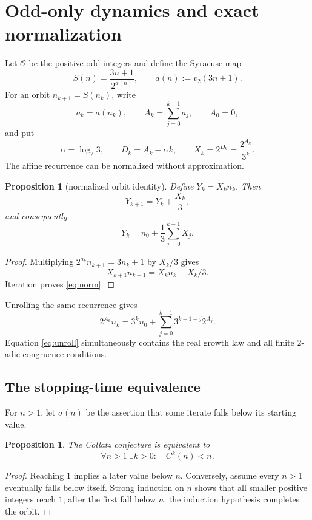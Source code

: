 \documentclass[11pt,reqno]{amsart}
\theoremstyle{plain}
\newtheorem{proposition}[theorem]{Proposition}
\theoremstyle{definition}
\numberwithin{equation}{section}
\newcommand{\Odd}{\mathcal{O}}
\begin{document}
\section{Odd-only dynamics and exact normalization}
\label{sec:odd}

Let $\Odd$ be the positive odd integers and define the Syracuse map
\[
S(n)=\frac{3n+1}{2^{a(n)}},
\qquad a(n):=v_2(3n+1).
\]
For an orbit $n_{k+1}=S(n_k)$, write
\[
a_k=a(n_k),\qquad
A_k=\sum_{j=0}^{k-1}a_j,\qquad A_0=0,
\]
and put
\[
\alpha=\log_2 3,
\qquad
D_k=A_k-\alpha k,
\qquad
X_k=2^{D_k}=\frac{2^{A_k}}{3^k}.
\]
The affine recurrence can be normalized without approximation.

\begin{proposition}[normalized orbit identity]
\label{prop:normalized}
Define $Y_k=X_kn_k$.  Then
\[
Y_{k+1}=Y_k+\frac{X_k}{3},
\]
and consequently
\begin{equation}\label{eq:norm}
Y_k=n_0+\frac13\sum_{j=0}^{k-1}X_j.
\end{equation}
\end{proposition}

\begin{proof}
Multiplying $2^{a_k}n_{k+1}=3n_k+1$ by $X_k/3$ gives
\[
X_{k+1}n_{k+1}=X_kn_k+X_k/3.
\]
Iteration proves \eqref{eq:norm}.
\end{proof}

Unrolling the same recurrence gives
\begin{equation}\label{eq:unroll}
2^{A_k}n_k
=3^kn_0+
\sum_{j=0}^{k-1}3^{k-1-j}2^{A_j}.
\end{equation}
Equation \eqref{eq:unroll} simultaneously contains the real growth law and all
finite $2$-adic congruence conditions.

\subsection{The stopping-time equivalence}

For $n>1$, let $\sigma(n)$ be the assertion that some iterate falls below its
starting value.

\begin{proposition}\label{prop:stopping}
The Collatz conjecture is equivalent to
\[
\forall n>1\ \exists k>0:\quad C^k(n)<n.
\]
\end{proposition}

\begin{proof}
Reaching $1$ implies a later value below $n$.  Conversely, assume every $n>1$
eventually falls below itself.  Strong induction on $n$ shows that all smaller
positive integers reach $1$; after the first fall below $n$, the induction
hypothesis completes the orbit.
\end{proof}
\end{document}
